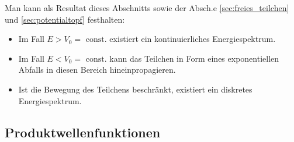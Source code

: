 \documentclass{book}
\begin{document}
Man kann als Resultat dieses Abschnitts sowie der Absch.e \ref{sec:freies_teilchen} und \ref{sec:potentialtopf} festhalten:
%
\begin{itemize}
\item Im Fall $E>V_0 = \text{ const}.$ existiert ein kontinuierliches Energiespektrum.
\item Im Fall $E<V_0 = \text{ const}.$ kann das Teilchen in Form eines exponentiellen Abfalls in diesen Bereich hineinpropagieren.
\item Ist die Bewegung des Teilchens beschränkt, existiert ein diskretes Energiespektrum.
\end{itemize}
%
\subsection{Produktwellenfunktionen}
\label{sec:produktwellenfunktionen}
\end{document}
